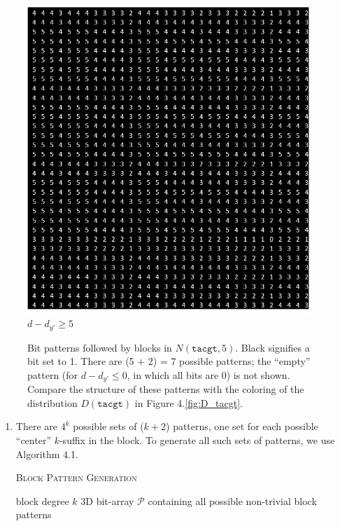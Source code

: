 \documentclass[oneside,12pt]{DISCSthesis}
\begin{document}
{\begin{figure}[h]
				\begin{minipage}{.33\textwidth} \centering \includegraphics[width=0.95\textwidth]{img/5} $d-d_{y'} \geq 5$ \end{minipage}
				\newline\newline
				\caption{
					Bit patterns followed by blocks in $N(\texttt{tacgt}, 5)$. Black signifies a bit set to 1. There are (5 + 2) = 7 possible patterns; the ``empty'' pattern (for $d - d_{y'} \leq 0$, in which all bits are 0) is not shown. Compare the structure of these patterns with the coloring of the distribution $D(\texttt{tacgt})$ in Figure 4.\ref{fig:D_tacgt}.
					}
			\end{figure}

		\begin{enumerate}
			\setcounter{enumi}{\theenumTemp}
			
			\item There are $4^k$ possible sets of ($k+2$) patterns, one set for each possible ``center'' $k$-suffix in the block. To generate all such sets of patterns, we use Algorithm 4.1.

			\bigskip\bigskip

			{
			\noindent \hspace*{6pt}{\bf Algorithm 4.1}
			\textsc{Block Pattern Generation}\small
			\begin{algorithmic}[1]\label{alg:block-pattern-gen}
				\Require block degree $k$
				\Ensure 3D bit-array $\mathcal{P}$ containing all possible non-trivial block patterns \vspace*{6pt}


\end{algorithmic}}
\end{enumerate}}
\end{document}
